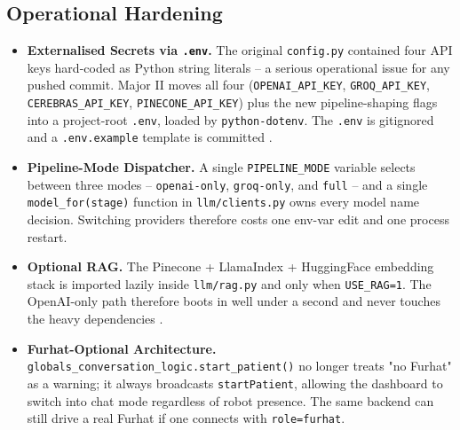 \documentclass{article}
\begin{document}
\subsection{Operational Hardening}
\begin{itemize}
    \item \textbf{Externalised Secrets via \texttt{.env}.} The original \texttt{config.py} contained four API keys hard-coded as Python string literals -- a serious operational issue for any pushed commit. Major II moves all four (\texttt{OPENAI\_API\_KEY}, \texttt{GROQ\_API\_KEY}, \texttt{CEREBRAS\_API\_KEY}, \texttt{PINECONE\_API\_KEY}) plus the new pipeline-shaping flags into a project-root \texttt{.env}, loaded by \texttt{python-dotenv}. The \texttt{.env} is gitignored and a \texttt{.env.example} template is committed \cite{Shen2019ALA}.

    \item \textbf{Pipeline-Mode Dispatcher.} A single \texttt{PIPELINE\_MODE} variable selects between three modes -- \texttt{openai-only}, \texttt{groq-only}, and \texttt{full} -- and a single \texttt{model\_for(stage)} function in \texttt{llm/clients.py} owns every model name decision. Switching providers therefore costs one env-var edit and one process restart.

    \item \textbf{Optional RAG.} The Pinecone + LlamaIndex + HuggingFace embedding stack is imported lazily inside \texttt{llm/rag.py} and only when \texttt{USE\_RAG=1}. The OpenAI-only path therefore boots in well under a second and never touches the heavy dependencies \cite{Monir2024VectorSearchED}.

    \item \textbf{Furhat-Optional Architecture.} \texttt{globals\_conversation\_logic.start\_patient()} no longer treats "no Furhat" as a warning; it always broadcasts \texttt{startPatient}, allowing the dashboard to switch into chat mode regardless of robot presence. The same backend can still drive a real Furhat if one connects with \texttt{role=furhat}.
\end{itemize}
\end{document}
